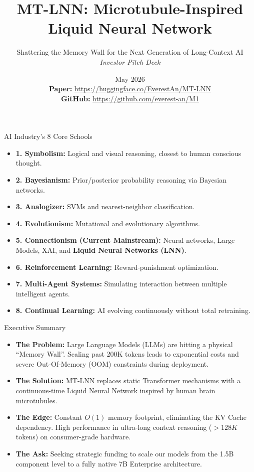 ﻿\documentclass[aspectratio=169, 10pt]{beamer}
\title{MT-LNN: Microtubule-Inspired Liquid Neural Network}
\subtitle{Shattering the Memory Wall for the Next Generation of Long-Context AI \\ \textit{Investor Pitch Deck}}
\author{\Huge \aeonik{Awareness}}
\date{May 2026 \\[1em]
\footnotesize
\textbf{Paper:} \url{https://huggingface.co/EverestAn/MT-LNN} \\
\textbf{GitHub:} \url{https://github.com/everest-an/M1}
}
\begin{document}
\frame{\titlepage}

\begin{frame}{AI Industry's 8 Core Schools}
\begin{itemize}
    \item \textbf{1. Symbolism:} Logical and visual reasoning, closest to human conscious thought.
    \item \textbf{2. Bayesianism:} Prior/posterior probability reasoning via Bayesian networks.
    \item \textbf{3. Analogizer:} SVMs and nearest-neighbor classification.
    \item \textbf{4. Evolutionism:} Mutational and evolutionary algorithms.
    \item \textbf{5. Connectionism (Current Mainstream):} Neural networks, Large Models, XAI, and \textbf{Liquid Neural Networks (LNN)}.
    \item \textbf{6. Reinforcement Learning:} Reward-punishment optimization.
    \item \textbf{7. Multi-Agent Systems:} Simulating interaction between multiple intelligent agents.
    \item \textbf{8. Continual Learning:} AI evolving continuously without total retraining.
\end{itemize}
\end{frame}

\begin{frame}{Executive Summary}
\begin{itemize}
    \item \textbf{The Problem:} Large Language Models (LLMs) are hitting a physical ``Memory Wall''. Scaling past 200K tokens leads to exponential costs and severe Out-Of-Memory (OOM) constraints during deployment.
    \item \textbf{The Solution:} MT-LNN replaces static Transformer mechanisms with a continuous-time Liquid Neural Network inspired by human brain microtubules.
    \item \textbf{The Edge:} Constant $O(1)$ memory footprint, eliminating the KV Cache dependency. High performance in ultra-long context reasoning ($>128K$ tokens) on consumer-grade hardware.
    \item \textbf{The Ask:} Seeking strategic funding to scale our models from the 1.5B component level to a fully native 7B Enterprise architecture.
\end{itemize}
\end{frame}
\end{document}
